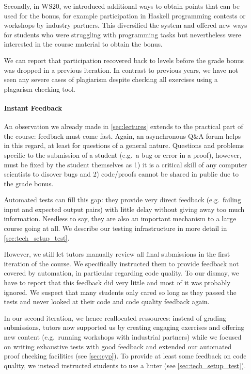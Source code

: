 Secondly, in WS20, we introduced additional ways to
obtain points that can be used for the bonus,
for example participation in Haskell programming contests or workshops by industry partners.
This diversified the system and offered new ways for students who were struggling
with programming tasks but nevertheless were interested in the course material
to obtain the bonus.

We can report that participation recovered
back to levels before the grade bonus was dropped in a previous iteration.
In contrast to previous years,
we have not seen any severe cases of plagiarism despite
checking all exercises using a plagarism checking tool.

\paragraph{Instant Feedback}
An observation we already made in \cref{sec:lectures}
extends to the practical part of the course:
feedback must come fast.
Again, an asynchronous Q\&A forum helps in this regard,
at least for questions of a general nature.
Questions and problems specific to the submission of a student (e.g.\ a bug or error in a proof),
however, must be fixed by the student themselves as 1) it is a critical skill of any computer scientists to disover bugs and 2) code/proofs cannot be shared in public due to the grade bonus.

Automated tests can fill this gap:
they provide very direct feedback (e.g.\ failing input and expected output pairs) with little delay
without giving away too much information.
Needless to say, they are also an important mechanism
to a large course going at all.
We describe our testing infrastructure in more detail in \cref{sec:tech_setup_test}.

However, we still let tutors manually review all final submissions
in the first iteration of the course.
We specifically instructed them to provide feedback not covered by automation,
in particular regarding code quality.
To our dismay, we have to report that this feedback did very little and
most of it was probably ignored.
We suspect that many students only cared so long as they passed the tests
and never looked at their code and code quality feedback again.

In our second iteration, we hence reallocated ressources:
instead of grading submissions,
tutors now supported us by creating engaging exercises
and offering new content (e.g.\ running workshops with industrial partners)
while we focused on writing exhaustive tests with good feedback and extended our automated proof checking facilities (see \cref{sec:cyp}).
To provide at least some feedback on
code quality, we instead instructed students
to use a linter (see \cref{sec:tech_setup_test}).

